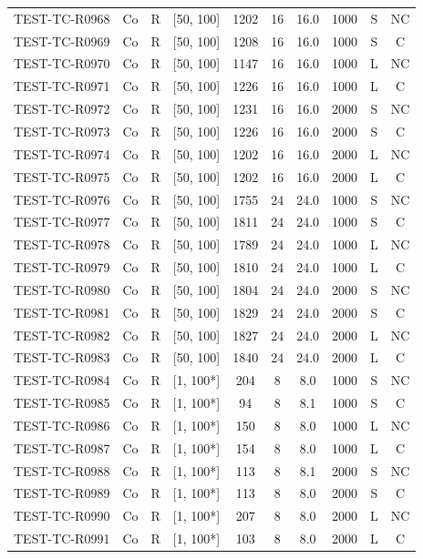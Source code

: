 \begin{longtable}{lccccccccc}
TEST-TC-R0968 & Co & R & [50, 100] & 1202 & 16 & 16.0 & 1000 & S & NC \\
TEST-TC-R0969 & Co & R & [50, 100] & 1208 & 16 & 16.0 & 1000 & S & C \\
TEST-TC-R0970 & Co & R & [50, 100] & 1147 & 16 & 16.0 & 1000 & L & NC \\
TEST-TC-R0971 & Co & R & [50, 100] & 1226 & 16 & 16.0 & 1000 & L & C \\
TEST-TC-R0972 & Co & R & [50, 100] & 1231 & 16 & 16.0 & 2000 & S & NC \\
TEST-TC-R0973 & Co & R & [50, 100] & 1226 & 16 & 16.0 & 2000 & S & C \\
TEST-TC-R0974 & Co & R & [50, 100] & 1202 & 16 & 16.0 & 2000 & L & NC \\
TEST-TC-R0975 & Co & R & [50, 100] & 1202 & 16 & 16.0 & 2000 & L & C \\
TEST-TC-R0976 & Co & R & [50, 100] & 1755 & 24 & 24.0 & 1000 & S & NC \\
TEST-TC-R0977 & Co & R & [50, 100] & 1811 & 24 & 24.0 & 1000 & S & C \\
TEST-TC-R0978 & Co & R & [50, 100] & 1789 & 24 & 24.0 & 1000 & L & NC \\
TEST-TC-R0979 & Co & R & [50, 100] & 1810 & 24 & 24.0 & 1000 & L & C \\
TEST-TC-R0980 & Co & R & [50, 100] & 1804 & 24 & 24.0 & 2000 & S & NC \\
TEST-TC-R0981 & Co & R & [50, 100] & 1829 & 24 & 24.0 & 2000 & S & C \\
TEST-TC-R0982 & Co & R & [50, 100] & 1827 & 24 & 24.0 & 2000 & L & NC \\
TEST-TC-R0983 & Co & R & [50, 100] & 1840 & 24 & 24.0 & 2000 & L & C \\
TEST-TC-R0984 & Co & R & [1, 100*] & 204 & 8 & 8.0 & 1000 & S & NC \\
TEST-TC-R0985 & Co & R & [1, 100*] & 94 & 8 & 8.1 & 1000 & S & C \\
TEST-TC-R0986 & Co & R & [1, 100*] & 150 & 8 & 8.0 & 1000 & L & NC \\
TEST-TC-R0987 & Co & R & [1, 100*] & 154 & 8 & 8.0 & 1000 & L & C \\
TEST-TC-R0988 & Co & R & [1, 100*] & 113 & 8 & 8.1 & 2000 & S & NC \\
TEST-TC-R0989 & Co & R & [1, 100*] & 113 & 8 & 8.0 & 2000 & S & C \\
TEST-TC-R0990 & Co & R & [1, 100*] & 207 & 8 & 8.0 & 2000 & L & NC \\
TEST-TC-R0991 & Co & R & [1, 100*] & 103 & 8 & 8.0 & 2000 & L & C \\

\end{longtable}
